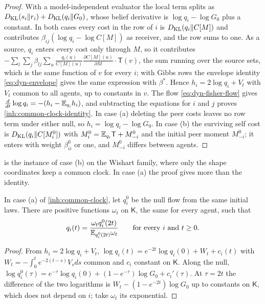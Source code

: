 \begin{proof}
With a model-independent evaluator the local term splits as
$D_{\mathrm{KL}}(s_i\Vert r_i)+D_{\mathrm{KL}}(q_i\Vert G_0)$, whose belief derivative is
$\log q_i-\log G_0$ plus a constant. In both cases every cost in the row of
$i$ is $D_{\mathrm{KL}}(q_i\Vert C[M])$ and contributes $\beta_{ij}(\log q_i-\log C[M])$
as receiver, and the row sums to one. As a source, $q_i$ enters every cost
only through $M$, so it contributes
$-\sum_{l}\sum_{j}\beta_{lj}\sum_u\frac{q_l(u)}{C[M](u)}
\frac{\partial C[M](u)}{\partial M}\cdot\mathsf T(v)$, the sum running over
the source sets, which is the same function of $v$ for every $i$; with Gibbs
rows the envelope identity \cref{eq:dyn-envelope} gives the same expression
with $\beta^*$. Hence $h_i=2\log q_i+V_t$ with $V_t$ common to all agents, up
to constants in $v$. The flow \cref{eq:dyn-fisher-flow} gives
$\frac{d}{dt}\log q_i=-(h_i-\mathbb E_{q_i}h_i)$, and subtracting the equations for
$i$ and $j$ proves \cref{inh:common-clock-identity}. In case (a) deleting
the peer costs leaves no row term under either null, so
$h_i=\log q_i-\log G_0$. In case (b) the surviving self cost is
$D_{\mathrm{KL}}(q_i\Vert C[M_i^0])$ with $M_i^0=\mathbb E_{q_i}\mathsf T+M^0_{-i}$ and the
initial peer moment $M^0_{-i}$; it enters with weight $\beta^0_{ii}$ or one,
and $M^0_{-i}$ differs between agents.
\end{proof}

 is the instance of case (b) on the Wishart family,
where only the shape coordinates keep a common clock. In case (a) the proof
gives more than the identity.

In case (a) of \cref{inh:common-clock}, let $q^0_i$ be the null flow from the
same initial laws. There are positive functions $\omega_t$ on $\mathsf K$,
the same for every agent, such that
\begin{equation}
 q_i(t)=\frac{\omega_tq_i^0(2t)}{\mathbb E_{q_i^0(2t)}\omega_t}
 \qquad\text{for every }i\text{ and }t\geq0.
 \label{inh:common-tilt-identity}
\end{equation}
\begin{proof}
From $h_i=2\log q_i+V_t$, $\log q_i(t)=e^{-2t}\log q_i(0)+W_t+c_i(t)$ with
$W_t=-\int_0^te^{-2(t-s)}V_sds$ common and $c_i$ constant on $\mathsf K$.
Along the null, $\log q_i^0(\tau)=e^{-\tau}\log q_i(0)+(1-e^{-\tau})\log G_0
+c_i'(\tau)$. At $\tau=2t$ the difference of the two logarithms is
$W_t-(1-e^{-2t})\log G_0$ up to constants on $\mathsf K$, which does not
depend on $i$; take $\omega_t$ its exponential.
\end{proof}

